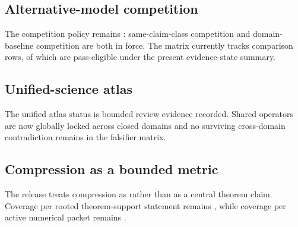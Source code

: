 \subsection{Alternative-model competition}
The competition policy remains : same-claim-class competition and domain-baseline competition are both in force. The matrix currently tracks  comparison rows, of which  are pass-eligible under the present evidence-state summary.

\subsection{Unified-science atlas}
The unified atlas status is bounded review evidence recorded. Shared operators are now globally locked across closed domains and no surviving cross-domain contradiction remains in the falsifier matrix.

\subsection{Compression as a bounded metric}
The release treats compression as  rather than as a central theorem claim. Coverage per rooted theorem-support statement remains , while coverage per active numerical packet remains .
